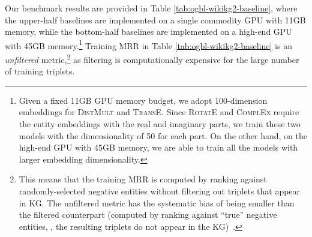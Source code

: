 {Our benchmark results are provided in Table \ref{tab:ogbl-wikikg2-baseline}, where the upper-half baselines are implemented on a single commodity GPU with 11GB memory, while the bottom-half baselines are implemented on a high-end GPU with 45GB memory.\footnote{Given a fixed 11GB GPU memory budget, we adopt 100-dimension embeddings for \textsc{DistMult} and \textsc{TransE}. Since \textsc{RotatE} and \textsc{ComplEx} require the entity embeddings with the real and imaginary parts, we train these two models with the dimensionality of 50 for each part. On the other hand, on the high-end GPU with 45GB memory, we are able to train all the models with  larger embedding dimensionality.}
Training MRR in Table \ref{tab:ogbl-wikikg2-baseline} is an \emph{unfiltered} metric,\footnote{This means that the training MRR is computed by ranking against randomly-selected negative entities without filtering out triplets that appear in KG.
The unfiltered metric has the systematic bias of being smaller than the filtered counterpart (computed by ranking against ``true'' negative entities, \ie, the resulting triplets do not appear in the KG)~\citep{bordes2013translating}.} as filtering is computationally expensive for the large number of training triplets.

}
